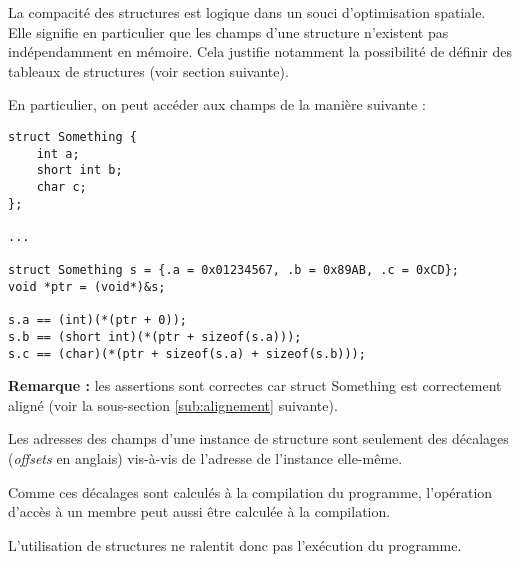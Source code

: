 \documentclass[../../../main.tex]{subfiles}
\begin{document}
La compacité des structures est logique dans un souci d'optimisation spatiale. Elle signifie en particulier que les champs d'une structure n'existent pas indépendamment en mémoire. Cela justifie notamment la possibilité de définir des tableaux de structures (voir section suivante).

En particulier, on peut accéder aux champs de la manière suivante :
\begin{verbatim}
struct Something {
	int a;
	short int b;
	char c;
};

...

struct Something s = {.a = 0x01234567, .b = 0x89AB, .c = 0xCD};
void *ptr = (void*)&s;

s.a == (int)(*(ptr + 0));
s.b == (short int)(*(ptr + sizeof(s.a)));
s.c == (char)(*(ptr + sizeof(s.a) + sizeof(s.b)));
\end{verbatim}
\textbf{Remarque :} les assertions sont correctes car \textsf{struct Something} est correctement aligné (voir la sous-section \ref{sub:alignement} suivante).

Les adresses des champs d'une instance de structure sont seulement des décalages (\textit{offsets} en anglais) vis-à-vis de l'adresse de l'instance elle-même.

Comme ces décalages sont calculés à la compilation du programme, l'opération d'accès à un membre peut aussi être calculée à la compilation.

L'utilisation de structures ne ralentit donc pas l'exécution du programme.
\end{document}
